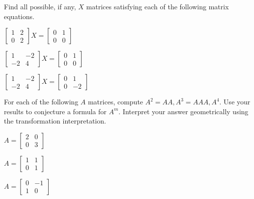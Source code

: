 \item Find all possible, if any, $X$ matrices satisfying each of the following matrix equations.
\ba
\item $ \left[ \begin{array}{cc} 1&2 \\ 0 & 2 \end{array} \right] X = \left[ \begin{array}{cc} 0&1 \\ 0 & 0 \end{array} \right]$
\item $ \left[ \begin{array}{rr} 1&-2 \\ -2 & 4 \end{array} \right] X = \left[ \begin{array}{cc} 0&1 \\ 0 & 0 \end{array} \right]$
\item $ \left[ \begin{array}{rr} 1&-2 \\ -2 & 4 \end{array} \right] X = \left[ \begin{array}{cc} 0&1 \\ 0 &-2 \end{array} \right]$
\ea

\item For each of the following $A$ matrices, compute $A^2=AA, A^3=AAA, A^4$. Use your results to conjecture a formula for $A^m$. Interpret your answer geometrically using the transformation interpretation.

\ba 
\begin{minipage}{1.5in}
\item $ A = \left[ \begin{array}{cc} 2&0 \\ 0 & 3 \end{array} \right]$
\end{minipage}
\begin{minipage}{1.5in}
\item $ A = \left[ \begin{array}{cc} 1&1 \\ 0 & 1 \end{array} \right]$
\end{minipage}
\begin{minipage}{1.5in}
\item $ A = \left[ \begin{array}{cr} 0&-1 \\ 1 & 0 \end{array} \right]$
\end{minipage}
\ea

